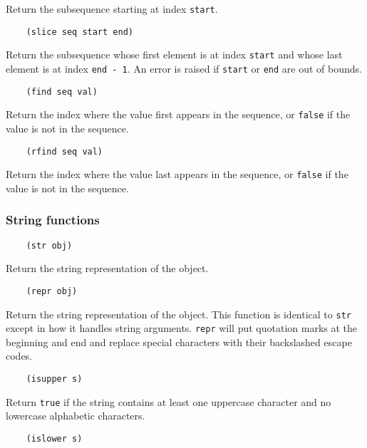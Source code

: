 \documentclass{article}
\newcommand{\inlinecode}{\texttt}
\begin{document}
Return the subsequence starting at index \inlinecode{start}.

\begin{verbatim}
    (slice seq start end)
\end{verbatim}

Return the subsequence whose first element is at index \inlinecode{start} and whose last element is at index \inlinecode{end - 1}. An error is raised if \inlinecode{start} or \inlinecode{end} are out of bounds.

\begin{verbatim}
    (find seq val)
\end{verbatim}

Return the index where the value first appears in the sequence, or \inlinecode{false} if the value is not in the sequence.

\begin{verbatim}
    (rfind seq val)
\end{verbatim}

Return the index where the value last appears in the sequence, or \inlinecode{false} if the value is not in the sequence.

\subsubsection{String functions}
\begin{verbatim}
    (str obj)
\end{verbatim}

Return the string representation of the object.

\begin{verbatim}
    (repr obj)
\end{verbatim}

Return the string representation of the object. This function is identical to \inlinecode{str} except in how it handles string arguments. \inlinecode{repr} will put quotation marks at the beginning and end and replace special characters with their backslashed escape codes.

\begin{verbatim}
    (isupper s)
\end{verbatim}

Return \inlinecode{true} if the string contains at least one uppercase character and no lowercase alphabetic characters.

\begin{verbatim}
    (islower s)
\end{verbatim}
\end{document}
